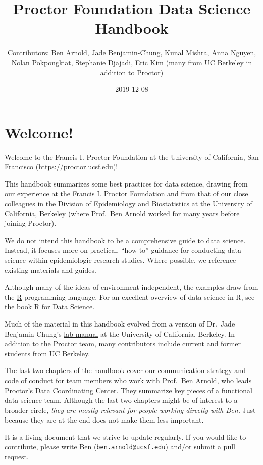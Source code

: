 \documentclass[]{book}
\title{Proctor Foundation Data Science Handbook}
\author{Contributors: Ben Arnold, Jade Benjamin-Chung, Kunal Mishra, Anna Nguyen, Nolan Pokpongkiat, Stephanie Djajadi, Eric Kim (many from UC Berkeley in addition to Proctor)}
\date{2019-12-08}
\begin{document}
\maketitle

{
\setcounter{tocdepth}{1}
\tableofcontents
}
\hypertarget{welcome}{%
\chapter*{Welcome!}\label{welcome}}

Welcome to the Francis I. Proctor Foundation at the University of California, San Francisco (\url{https://proctor.ucsf.edu})!

This handbook summarizes some best practices for data science, drawing from our experience at the Francis I. Proctor Foundation and from that of our close colleagues in the Division of Epidemiology and Biostatistics at the University of California, Berkeley (where Prof.~Ben Arnold worked for many years before joining Proctor).

We do not intend this handbook to be a comprehensive guide to data science. Instead, it focuses more on practical, ``how-to'' guidance for conducting data science within epidemiologic research studies. Where possible, we reference existing materials and guides.

Although many of the ideas of environment-independent, the examples draw from the \href{https://cran.r-project.org/}{R} programming language. For an excellent overview of data science in R, see the book \href{https://r4ds.had.co.nz/}{R for Data Science}.

Much of the material in this handbook evolved from a version of Dr.~Jade Benjamin-Chung's \href{https://github.com/jadebc-berkeley/lab-manual}{lab manual} at the University of California, Berkeley. In addition to the Proctor team, many contributors include current and former students from UC Berkeley.

The last two chapters of the handbook cover our communication strategy and code of conduct for team members who work with Prof.~Ben Arnold, who leads Proctor's Data Coordinating Center. They summarize key pieces of a functional data science team. Although the last two chapters might be of interest to a broader circle, \emph{they are mostly relevant for people working directly with Ben.} Just because they are at the end does not make them less important.

It is a living document that we strive to update regularly. If you would like to contribute, please write Ben (\href{mailto:ben.arnold@ucsf.edu}{\nolinkurl{ben.arnold@ucsf.edu}}) and/or submit a pull request.
\end{document}
